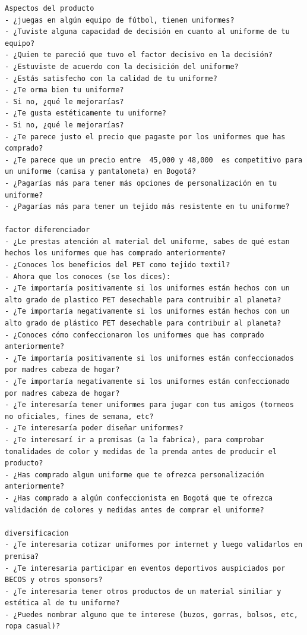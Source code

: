 \documentclass[11pt]{article}
\begin{document}
\begin{verbatim}
Aspectos del producto    
- ¿juegas en algún equipo de fútbol, tienen uniformes?
- ¿Tuviste alguna capacidad de decisión en cuanto al uniforme de tu equipo?
- ¿Quien te pareció que tuvo el factor decisivo en la decisión?
- ¿Estuviste de acuerdo con la decisición del uniforme?
- ¿Estás satisfecho con la calidad de tu uniforme?
- ¿Te orma bien tu uniforme?
- Si no, ¿qué le mejorarías?
- ¿Te gusta estéticamente tu uniforme?
- Si no, ¿qué le mejorarías?
- ¿Te parece justo el precio que pagaste por los uniformes que has comprado?
- ¿Te parece que un precio entre  45,000 y 48,000  es competitivo para un uniforme (camisa y pantaloneta) en Bogotá?
- ¿Pagarías más para tener más opciones de personalización en tu uniforme?
- ¿Pagarías más para tener un tejido más resistente en tu uniforme?

factor diferenciador 
- ¿Le prestas atención al material del uniforme, sabes de qué estan hechos los uniformes que has comprado anteriormente?
- ¿Conoces los beneficios del PET como tejido textil?
- Ahora que los conoces (se los dices):
- ¿Te importaría positivamente si los uniformes están hechos con un alto grado de plastico PET desechable para contruibir al planeta?
- ¿Te importaría negativamente si los uniformes están hechos con un alto grado de plástico PET desechable para contribuir al planeta?
- ¿Conoces cómo confeccionaron los uniformes que has comprado anteriormente?
- ¿Te importaría positivamente si los uniformes están confeccionados por madres cabeza de hogar?
- ¿Te importaría negativamente si los uniformes están confeccionado por madres cabeza de hogar?
- ¿Te interesaría tener uniformes para jugar con tus amigos (torneos no oficiales, fines de semana, etc?
- ¿Te interesaría poder diseñar uniformes?
- ¿Te interesarí ir a premisas (a la fabrica), para comprobar tonalidades de color y medidas de la prenda antes de producir el producto?
- ¿Has comprado algun uniforme que te ofrezca personalización anteriormente?
- ¿Has comprado a algún confeccionista en Bogotá que te ofrezca validación de colores y medidas antes de comprar el uniforme?

diversificacion
- ¿Te interesaria cotizar uniformes por internet y luego validarlos en premisa?
- ¿Te interesaria participar en eventos deportivos auspiciados por BECOS y otros sponsors?
- ¿Te interesaria tener otros productos de un material similiar y estética al de tu uniforme?
- ¿Puedes nombrar alguno que te interese (buzos, gorras, bolsos, etc, ropa casual)?


\end{verbatim}
\end{document}
